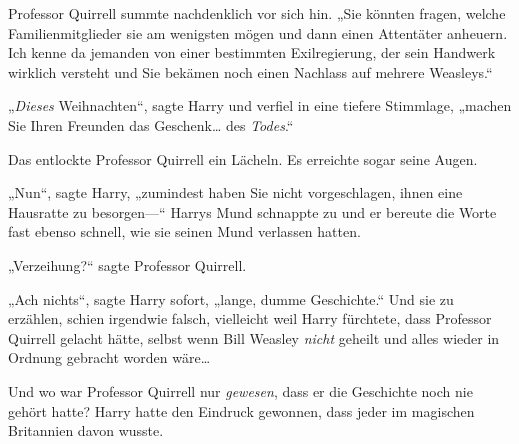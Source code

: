 Professor Quirrell summte nachdenklich vor sich hin. „Sie könnten fragen, welche Familienmitglieder sie am wenigsten mögen und dann einen Attentäter anheuern. Ich kenne da jemanden von einer bestimmten Exilregierung, der sein Handwerk wirklich versteht und Sie bekämen noch einen Nachlass auf mehrere Weasleys.“

„\emph{Dieses} Weihnachten“, sagte Harry und verfiel in eine tiefere Stimmlage, „machen Sie Ihren Freunden das Geschenk… des \emph{Todes}.“

Das entlockte Professor Quirrell ein Lächeln. Es erreichte sogar seine Augen.

„Nun“, sagte Harry, „zumindest haben Sie nicht vorgeschlagen, ihnen eine Hausratte zu besorgen—“ Harrys Mund schnappte zu und er bereute die Worte fast ebenso schnell, wie sie seinen Mund verlassen hatten.

„Verzeihung?“ sagte Professor Quirrell.

„Ach nichts“, sagte Harry sofort, „lange, dumme Geschichte.“ Und sie zu erzählen, schien irgendwie falsch, vielleicht weil Harry fürchtete, dass Professor Quirrell gelacht hätte, selbst wenn Bill Weasley \emph{nicht} geheilt und alles wieder in Ordnung gebracht worden wäre…

Und wo war Professor Quirrell nur \emph{gewesen}, dass er die Geschichte noch nie gehört hatte? Harry hatte den Eindruck gewonnen, dass jeder im magischen Britannien davon wusste.

